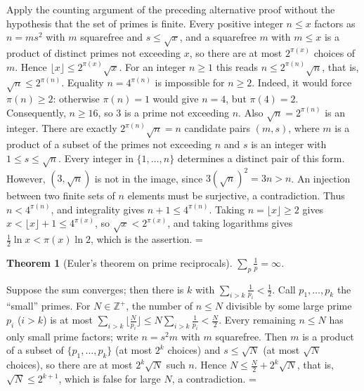 \documentclass[11pt]{article}
\makeatletter
\let\nt@closedisplay\]
\def\nt@guardedclose{\@ifnextchar\par{\nt@closeafterpar}{\@ifnextchar\end{\postdisplaypenalty\@M\nt@closedisplay}{\nt@closedisplay}}}
\def\nt@closeafterpar\par{\@ifnextchar\par{\nt@closeafterpar}{\@ifnextchar\end{\postdisplaypenalty\@M\nt@closedisplay\par}{\nt@closedisplay\par}}}
\renewenvironment{proof}[1][\proofname]{\par
  \pushQED{\qed}\normalfont\topsep\medskipamount\edef\nt@afterproof{\@endparpenalty=\the\@endparpenalty\relax}\@beginparpenalty\@M\@endparpenalty\@M\let\]\nt@guardedclose\trivlist\item[]\textit{#1\@addpunct{.}} \ignorespaces}{\ifvmode\addpenalty\@M\fi\popQED\nt@afterproof\endtrivlist\@endpefalse}
\theoremstyle{ntstyle}
\newtheorem{theorem}{Theorem}[subsection]
\makeatother
\begin{document}
\begin{proof} Apply the counting argument of the preceding
  alternative proof without the hypothesis that the set of primes is finite.
  Every positive integer $n\le x$ factors as $n=ms^{2}$ with $m$ squarefree and
  $s\le\sqrt{x}$, and a squarefree $m$ with $m \le x$ is a product of distinct
  primes not exceeding $x$, so there are at most $2^{\pi(x)}$ choices of $m$.
  Hence $\lfloor x\rfloor\le 2^{\pi(x)}\sqrt{x}$. For an integer $n\ge1$ this
  reads $n\le 2^{\pi(n)}\sqrt{n}$, that is, $\sqrt{n}\le 2^{\pi(n)}$. Equality $n=4^{\pi(n)}$ is impossible for $n\ge2$.
  Indeed, it would force $\pi(n)\ge2$: otherwise $\pi(n)=1$
  would give $n=4$, but $\pi(4)=2$.
  Consequently, $n\ge16$, so $3$ is a prime not exceeding $n$.
  Also $\sqrt n=2^{\pi(n)}$ is an integer. There are exactly
  $2^{\pi(n)}\sqrt n=n$ candidate pairs $(m,s)$, where $m$ is
  a product of a subset of the primes not exceeding $n$ and
  $s$ is an integer with $1\le s\le\sqrt n$.
  Every integer in $\{1,\ldots,n\}$ determines a distinct pair of this form.
  However, $(3,\sqrt n)$ is not in the image, since
  $3(\sqrt n)^2=3n>n$. An injection between two finite sets of
  $n$ elements must be surjective, a contradiction.
  Thus $n<4^{\pi(n)}$, and integrality gives $n+1\le4^{\pi(n)}$. Taking
  $n=\lfloor x\rfloor\ge2$ gives $x<\lfloor x\rfloor+1\le 4^{\pi(x)}$, so
  $\sqrt{x}<2^{\pi(x)}$, and taking logarithms gives
  $\tfrac12\ln x<\pi(x)\ln 2$, which is the assertion.
\end{proof}

\begin{theorem}[Euler's theorem on prime reciprocals]\label{thm:9.6.2}\label{thm:euler-theorem-on-prime-reciprocals}
  $\sum_{p} \tfrac{1}{p} = \infty$.

\end{theorem}

\begin{proof} Suppose the sum converges; then there is
  $k$ with $\sum_{i>k}\tfrac{1}{p_i} < \tfrac{1}{2}$. Call $p_1,\ldots,p_k$
  the ``small'' primes. For $N \in \mathbb{Z}^+$, the number of $n \le N$
  divisible by some large prime $p_i$ ($i>k$) is at most
  $\sum_{i>k}\big\lfloor \tfrac{N}{p_i}\big\rfloor \le N\sum_{i>k}\tfrac{1}{p_i} < \tfrac{N}{2}$. Every remaining $n \le N$
  has only small prime factors; write $n = s^2 m$ with $m$
  squarefree. Then $m$ is a product of a subset of $\{p_1,\ldots,p_k\}$ (at
  most $2^k$ choices) and $s \le \sqrt{N}$ (at most $\sqrt{N}$ choices),
  so there are at most $2^k\sqrt{N}$ such $n$. Hence $N \le \tfrac{N}{2} + 2^k\sqrt{N}$, that is,
  $\sqrt{N} \le 2^{k+1}$, which is false for large $N$, a
  contradiction.
\end{proof}
\end{document}
